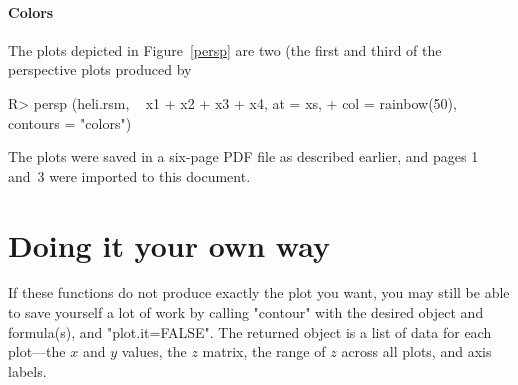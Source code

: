 \documentclass[article,nojss]{jss}
\begin{document}
\paragraph{Colors}
The plots depicted in Figure~\ref{persp} are two (the first and third of the perspective plots produced by
\begin{Schunk}
\begin{Sinput}
R> persp (heli.rsm, ~ x1 + x2 + x3 + x4, at = xs, 
+   col = rainbow(50), contours = "colors")
\end{Sinput}
\end{Schunk}
The plots were saved in a six-page PDF file as described earlier, and pages 1 and~3 were imported to this document.

\section{Doing it your own way}
If these functions do not produce exactly the plot you want, you may still be able to save yourself a lot of work by calling "contour" with the desired object and formula(s), and "plot.it=FALSE".  The returned object is a list of data for each plot---the $x$ and $y$ values, the $z$ matrix, the range of $z$ across all plots, and axis labels.


\end{document}
